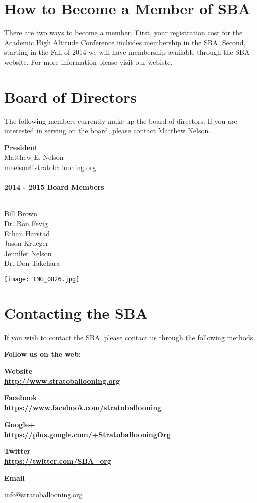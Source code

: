 \documentclass[10pt,foldmark,notumble]{leaflet}
\begin{document}
\section{How to Become a Member of SBA}
There are two ways to become a member.  First, your registration cost for the Academic High Altitude Conference includes membership in the SBA.  Second, starting in the Fall of 2014 we will have membership available through the SBA website.  For more information please visit our webiste.

\section{Board of Directors}
The following members currently make up the board of directors.  If you are interested in serving on the board, please contact Matthew Nelson.
\begin{center}
{\bf President} \ \\
Matthew E. Nelson\ \\
mnelson@stratoballooning.org \ \\ \ \\

{\bf 2014 - 2015 Board Members}\ \\ \ \\
\begin{multicols}{2}
Bill Brown  \ \\ Dr. Ron Fevig \ \\ Ethan Harstad \ \\ Jason Krueger \ \\ Jennifer Nelson \ \\ Dr. Don Takehara
\end{multicols}

\texttt{[image: IMG\_0826.jpg]}

\end{center}
\section{Contacting the SBA}
If you wish to contact the SBA, please contact us through the following methods

\begin{center}
\vspace{0.2cm}
{\large \bf Follow us on the web: }

\bf Website\ \\ \url{http://www.stratoballooning.org}

\bf Facebook\ \\ \url{https://www.facebook.com/stratoballooning}

\bf Google+\ \\ \url{https://plus.google.com/+StratoballooningOrg}

\bf Twitter\ \\ \url{https://twitter.com/SBA_org}

\vspace{0.2cm}
{\bf Email}

info@stratoballooning.org

\vspace{0.2cm}


\end{center}
\end{document}
